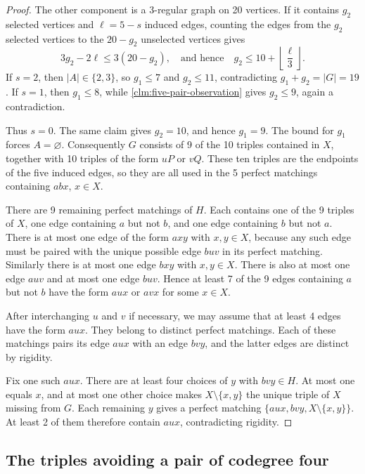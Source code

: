 \documentclass[10pt]{article}
\numberwithin{equation}{section}
\theoremstyle{definition}
\begin{document}
\begin{proof}
The other component is a $3$-regular graph on 20 vertices. If it contains $g_2$ selected vertices and $\ell=5-s$ induced edges, counting the edges from the $g_2$ selected vertices to the $20-g_2$ unselected vertices gives
\[
 3g_2-2\ell\le3(20-g_2),
 \quad\text{and hence}\quad g_2\le10+\left\lfloor\frac\ell3\right\rfloor.
\]
If $s=2$, then $|A|\in\{2,3\}$, so $g_1\le7$ and $g_2\le11$, contradicting $g_1+g_2=|G|=19$. If $s=1$, then $g_1\le8$, while \cref{clm:five-pair-observation} gives $g_2\le9$, again a contradiction.

Thus $s=0$. The same claim gives $g_2=10$, and hence $g_1=9$. The bound for $g_1$ forces $A=\varnothing$. Consequently $G$ consists of 9 of the 10 triples contained in $X$, together with 10 triples of the form $uP$ or $vQ$. These ten triples are the endpoints of the five induced edges, so they are all used in the 5 perfect matchings containing $abx$, $x\in X$.

There are 9 remaining perfect matchings of $H$. Each contains one of the 9 triples of $X$, one edge containing $a$ but not $b$, and one edge containing $b$ but not $a$. There is at most one edge of the form $axy$ with $x,y\in X$, because any such edge must be paired with the unique possible edge $buv$ in its perfect matching. Similarly there is at most one edge $bxy$ with $x,y\in X$. There is also at most one edge $auv$ and at most one edge $buv$. Hence at least 7 of the 9 edges containing $a$ but not $b$ have the form $aux$ or $avx$ for some $x\in X$.

After interchanging $u$ and $v$ if necessary, we may assume that at least 4 edges have the form $aux$. They belong to distinct perfect matchings. Each of these matchings pairs its edge $aux$ with an edge $bvy$, and the latter edges are distinct by rigidity.

Fix one such $aux$. There are at least four choices of $y$ with $bvy\in H$. At most one equals $x$, and at most one other choice makes $X\setminus\{x,y\}$ the unique triple of $X$ missing from $G$. Each remaining $y$ gives a perfect matching $\{aux,bvy,X\setminus\{x,y\}\}$. At least 2 of them therefore contain $aux$, contradicting rigidity.
\end{proof}

\subsection{The triples avoiding a pair of codegree four}
\end{document}
